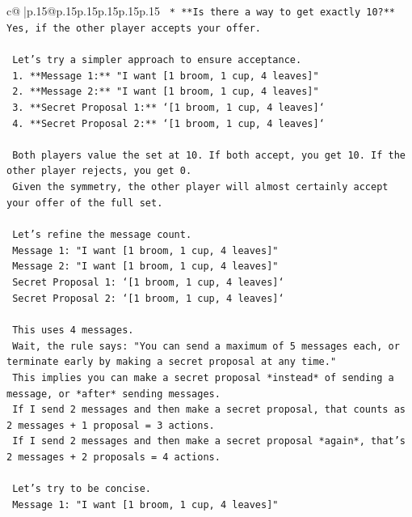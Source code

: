 \documentclass{article}
\begin{document}
{\begin{supertabular}{c@{$\;$}|p{.15\linewidth}@{}p{.15\linewidth}p{.15\linewidth}p{.15\linewidth}p{.15\linewidth}p{.15\linewidth}}
{{{\texttt{    *   **Is there a way to get exactly 10?** Yes, if the other player accepts your offer.} \\
\\ 
\texttt{    Let's try a simpler approach to ensure acceptance.} \\
\texttt{    1.  **Message 1:** "I want {[}1 broom, 1 cup, 4 leaves{]}"} \\
\texttt{    2.  **Message 2:** "I want {[}1 broom, 1 cup, 4 leaves{]}"} \\
\texttt{    3.  **Secret Proposal 1:** `{[}1 broom, 1 cup, 4 leaves{]}`} \\
\texttt{    4.  **Secret Proposal 2:** `{[}1 broom, 1 cup, 4 leaves{]}`} \\
\\ 
\texttt{    Both players value the set at 10. If both accept, you get 10. If the other player rejects, you get 0.} \\
\texttt{    Given the symmetry, the other player will almost certainly accept your offer of the full set.} \\
\\ 
\texttt{    Let's refine the message count.} \\
\texttt{    Message 1: "I want {[}1 broom, 1 cup, 4 leaves{]}"} \\
\texttt{    Message 2: "I want {[}1 broom, 1 cup, 4 leaves{]}"} \\
\texttt{    Secret Proposal 1: `{[}1 broom, 1 cup, 4 leaves{]}`} \\
\texttt{    Secret Proposal 2: `{[}1 broom, 1 cup, 4 leaves{]}`} \\
\\ 
\texttt{    This uses 4 messages.} \\
\texttt{    Wait, the rule says: "You can send a maximum of 5 messages each, or terminate early by making a secret proposal at any time."} \\
\texttt{    This implies you can make a secret proposal *instead* of sending a message, or *after* sending messages.} \\
\texttt{    If I send 2 messages and then make a secret proposal, that counts as 2 messages + 1 proposal = 3 actions.} \\
\texttt{    If I send 2 messages and then make a secret proposal *again*, that's 2 messages + 2 proposals = 4 actions.} \\
\\ 
\texttt{    Let's try to be concise.} \\
\texttt{    Message 1: "I want {[}1 broom, 1 cup, 4 leaves{]}"} \\
}}}
\end{supertabular}}
\end{document}

